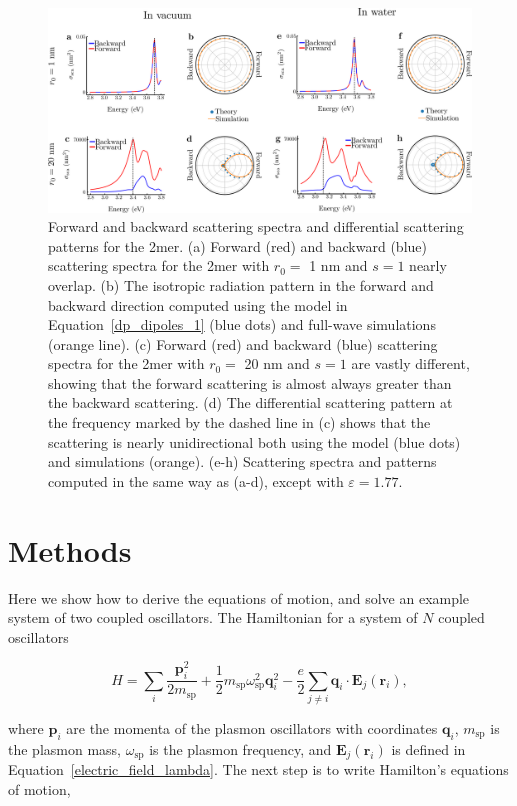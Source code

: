 \documentclass[journal=apchd5,manuscript=article]{achemso}
\begin{document}
\begin{figure}
\includegraphics[width=5.5in]{for_back_spectra.pdf}
\caption{Forward and backward scattering spectra and differential scattering patterns for the 2mer. (a) Forward (red) and backward (blue) scattering spectra for the 2mer with $r_0 =$ 1 nm and $s=1$ nearly overlap. (b) The isotropic radiation pattern in the forward and backward direction computed using the model in Equation~\ref{dp_dipoles_1} (blue dots) and full-wave simulations (orange line). (c) Forward (red) and backward (blue) scattering spectra for the 2mer with $r_0 =$ 20 nm and $s=1$ are vastly different, showing that the forward scattering is almost always greater than the backward scattering. (d) The differential scattering pattern at the frequency marked by the dashed line in (c) shows that the scattering is nearly unidirectional both using the model (blue dots) and simulations (orange). (e-h) Scattering spectra and patterns computed in the same way as (a-d), except with $\varepsilon = 1.77$.}
\label{xz_scattering}
\end{figure}

\section{Methods}
Here we show how to derive the equations of motion, and solve an example system of two coupled oscillators. The Hamiltonian for a system of $N$ coupled oscillators

\begin{equation}
H = \sum_{i}\frac{\textbf{p}_i^2}{2m_{\textrm{sp}}}+\frac{1}{2}m_{\textrm{sp}}\omega_{\textrm{sp}}^2\textbf{q}_i^2 - \frac{e}{2}\sum_{j\neq i}\textbf{q}_i\cdot\textbf{E}_j(\textbf{r}_i),
\label{hammy}
\end{equation}

\noindent where $\textbf{p}_i$ are the momenta of the plasmon oscillators with coordinates $\textbf{q}_i$, $m_{\textrm{sp}}$ is the plasmon mass, $\omega_{\textrm{sp}}$ is the plasmon frequency, and $\textbf{E}_j(\textbf{r}_i)$ is defined in Equation~\ref{electric_field_lambda}. The next step is to write Hamilton's equations of motion,
\end{document}
